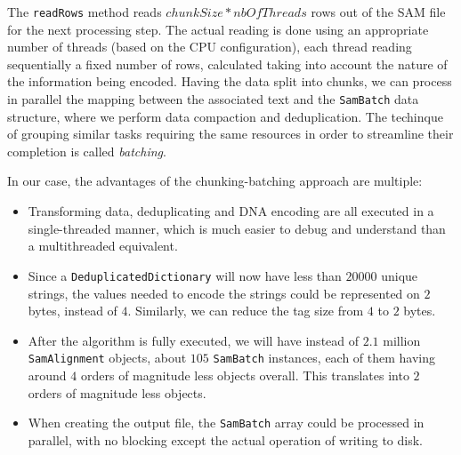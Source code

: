 \documentclass[a4paper,twoside]{article}
\begin{document}
The {\tt readRows} method reads $chunkSize * nbOfThreads$ rows out of the SAM file for the next processing step. The actual reading is done using an appropriate number of threads (based on the CPU configuration), each thread reading sequentially a fixed number of rows, calculated taking into account the nature of the information being encoded.
Having the data split into chunks, we can process in parallel the mapping between the associated text and the {\tt SamBatch} data structure, where we perform data compaction and deduplication.
The techinque of grouping similar tasks requiring the same resources in order to streamline their completion is called {\it batching}.

In our case, the advantages of the chunking-batching approach are multiple:
\begin{itemize}
\item Transforming data, deduplicating and DNA encoding are all executed in a single-threaded manner, which is much easier to debug and understand than a multithreaded equivalent.

\item Since a {\tt DeduplicatedDictionary} will now have less than $20000$ unique strings, the values needed to encode the strings could be represented on $2$ bytes, instead of $4$. Similarly, we can reduce the tag size from $4$ to $2$ bytes. 

\item After the algorithm is fully executed,  we will have instead of $2.1$ million {\tt SamAlignment} objects, about $105$ {\tt SamBatch} instances, each of them having around $4$ orders of magnitude less objects overall. This translates into $2$ orders of magnitude less objects.

\item When creating the output file, the {\tt SamBatch} array could be processed in parallel, with no blocking except the actual operation of writing to disk.
\end{itemize}
\end{document}
